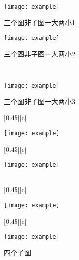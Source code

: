 \documentclass[12pt,a4paper,UTF8]{article}
\begin{document}
    \begin{figure}[!htbp]
        \centering
        \begin{minipage}[b]{0.45\textwidth}
            \centering
            \texttt{[image: example]}
            \caption{三个图非子图一大两小1}
             
        \end{minipage}
        \hspace{0.5cm}%
        \begin{minipage}[b]{0.4\textwidth}
            \begin{minipage}[b]{\textwidth}
                \centering
                \texttt{[image: example]}
                \caption{三个图非子图一大两小2}
                 
            \end{minipage}\\[0.8cm]%
            \begin{minipage}[b]{\textwidth}
                \centering
                \texttt{[image: example]}
                \caption{三个图非子图一大两小3}		
                 
            \end{minipage}	
        \end{minipage}
    \end{figure}

    \begin{figure}[!htbp]
        \centering
        [0.45\textwidth][c]{
            \centering
            \texttt{[image: example]}
             
        }%
        \hspace*{0.1cm}
        [0.45\textwidth][c]{
            \centering
            \texttt{[image: example]}
             
        }\\%
        [0.45\textwidth][c]{
            \centering
            \texttt{[image: example]}
             
        }%
        \hspace*{0.1cm}
        [0.45\textwidth][c]{
            \centering
            \texttt{[image: example]}
             
        }%
        \caption{四个子图}
         
    \end{figure}
\end{document}
